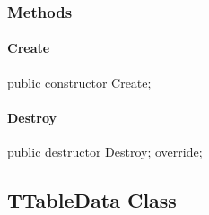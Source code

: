 \documentclass{report}
\newif\ifpdf
\begin{document}
\subsubsection*{\large{\textbf{Methods}}\normalsize\hspace{1ex}\hfill}
\paragraph*{Create}\hspace*{\fill}

\label{PasDoc_Gen.TRowData-Create}
\begin{list}{}{
\setlength{\itemindent}{0cm}
\setlength{\listparindent}{0cm}
\setlength{\leftmargin}{\evensidemargin}
\addtolength{\leftmargin}{\tmplength}
\settowidth{\labelsep}{X}
\addtolength{\leftmargin}{\labelsep}
\setlength{\labelwidth}{\tmplength}
}
\item[\textbf{Declaration}\hfill]
\ifpdf
\begin{flushleft}
\fi
\begin{ttfamily}
public constructor Create;\end{ttfamily}

\ifpdf
\end{flushleft}
\fi

\end{list}
\paragraph*{Destroy}\hspace*{\fill}

\label{PasDoc_Gen.TRowData-Destroy}
\begin{list}{}{
\setlength{\itemindent}{0cm}
\setlength{\listparindent}{0cm}
\setlength{\leftmargin}{\evensidemargin}
\addtolength{\leftmargin}{\tmplength}
\settowidth{\labelsep}{X}
\addtolength{\leftmargin}{\labelsep}
\setlength{\labelwidth}{\tmplength}
}
\item[\textbf{Declaration}\hfill]
\ifpdf
\begin{flushleft}
\fi
\begin{ttfamily}
public destructor Destroy; override;\end{ttfamily}

\ifpdf
\end{flushleft}
\fi

\end{list}
\ifpdf
\subsection*{\large{\textbf{TTableData Class}}\normalsize\hspace{1ex}\hrulefill}
\else
\end{document}
